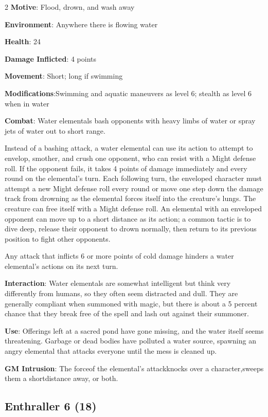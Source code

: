 \begin{multicols}{2}
\textbf{Motive}: Flood, drown, and wash away 

\textbf{Environment}: Anywhere there is flowing water 

\textbf{Health}: 24 

\textbf{Damage Inflicted}: 4 points 

\textbf{Movement}: Short; long if swimming 

\textbf{Modifications}:Swimming and aquatic maneuvers as level 6; stealth as level 6 when in water 

\textbf{Combat}: Water elementals bash opponents with heavy limbs of water or spray jets of water out to short range. 

Instead of a bashing attack, a water elemental can use its action to attempt to envelop, smother, and crush one opponent, who can resist with a Might defense roll. If the opponent fails, it takes 4 points of damage immediately and every round on the elemental’s turn. Each following turn, the enveloped character must attempt a new Might defense roll every round or move one step down the damage track from drowning as the elemental forces itself into the creature’s lungs. The creature can free itself with a Might defense roll. An elemental with an enveloped opponent can move up to a short distance as its action; a common tactic is to dive deep, release their opponent to drown normally, then return to its previous position to fight other opponents. 

Any attack that inflicts 6 or more points of cold damage hinders a water elemental’s actions on its next turn.

\textbf{Interaction}: Water elementals are somewhat intelligent but think very differently from humans, so they often seem distracted and dull. They are generally compliant when summoned with magic, but there is about a 5 percent chance that they break free of the spell and lash out against their summoner. 

\textbf{Use}: Offerings left at a sacred pond have gone missing, and the water itself seems threatening. Garbage or dead bodies have polluted a water source, spawning an angry elemental that attacks everyone until the mess is cleaned up.

\textbf{GM Intrusion}: The forceof the elemental’s attackknocks over a character,sweeps them a shortdistance away, or both.

\subsection{Enthraller	6 (18)}


\end{multicols}

